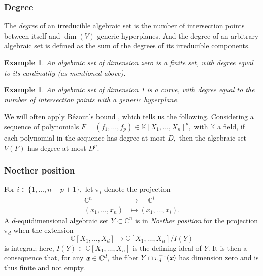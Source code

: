 \documentclass[a4paper]{article}
\def\xb{\textit{\textbf{x}}}
\def\C{\mathbb{C}}
\def\K{\mathbb{K}}
\newtheorem{ex}[theorem]{Example}
\begin{document}
\subsubsection{Degree}
The \textit{degree} of an irreducible algebraic set is the number of intersection points between itself and $\dim (V)$ generic hyperplanes. And the degree of an arbitrary algebraic set is defined as the sum of the degrees of its irreducible components.
%
\begin{ex}
An algebraic set of dimension zero is a finite set, with degree equal to its cardinality (as mentioned above).
\end{ex}
%
\begin{ex}
An algebraic set of dimension 1 is a curve, with degree equal to the number of intersection points with a generic hyperplane.
\end{ex}
%
We will often apply \label{Bezout} B\'ezout’s bound \cite[Theorem 1]{H}, which tells us the following. Considering a sequence of polynomials $F = (f_1,\hdots,f_p) \in \K[X_1,\hdots,X_n]^p,$ with $\K$ a field, if each polynomial in the sequence has degree at most $D,$ then the algebraic set $V(F)$ has degree at most $D^p$. 
\subsubsection{Noether position}
For $i \in
\{1,\hdots,n-p+1\},$  let $\pi_i$ denote the projection 
%
\begin{align*}
\C^n~~~~~ &\rightarrow~~~~~ \C^i \\
(x_1,\hdots,x_n) &\mapsto  (x_1,\hdots,x_i).    
\end{align*} 
A $d$-equidimensional algebraic set $Y \subset \C^n$ is in \textit{Noether position} for the projection
$\pi_d$ when the extension \[\C[X_1,\hdots,X_{d}] \rightarrow
\C[X_1,\hdots,X_n]/I(Y)\] is integral; here, $I(Y) \subset
\C[X_1,\hdots,X_n]$ is the defining ideal of $Y$. It is then a consequence that, for any $\xb \in \C^d,$ the fiber $Y \cap \pi_d^{-1}(\xb)$ has dimension zero and is thus finite and not empty.


\end{document}
